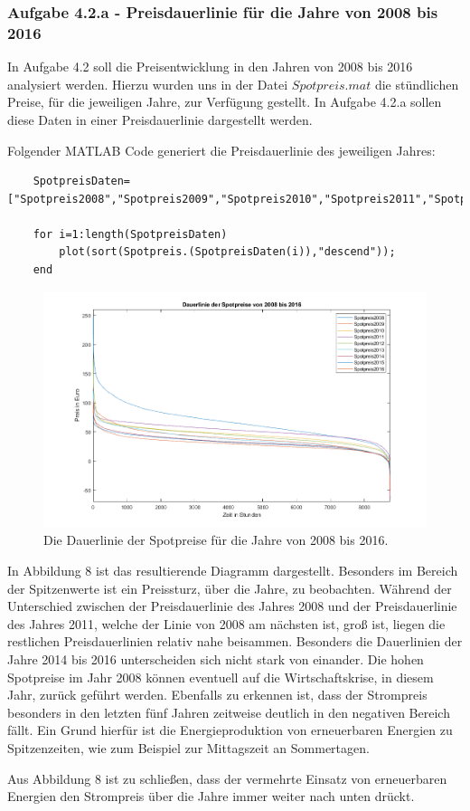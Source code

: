 \documentclass[a4paper,12pt]{article}
\begin{document}
	\subsubsection{Aufgabe 4.2.a - Preisdauerlinie für die Jahre von 2008 bis 2016}
	In Aufgabe 4.2 soll die Preisentwicklung in den Jahren von 2008 bis 2016 analysiert werden. Hierzu wurden uns in der Datei $Spotpreis.mat$ die stündlichen Preise, für die jeweiligen Jahre, zur Verfügung gestellt.\newline
	In Aufgabe 4.2.a sollen diese Daten in einer Preisdauerlinie dargestellt werden.\\ \par
	Folgender MATLAB Code generiert die Preisdauerlinie des jeweiligen Jahres:
	\begin{lstlisting}
	SpotpreisDaten=["Spotpreis2008","Spotpreis2009","Spotpreis2010","Spotpreis2011","Spotpreis2012","Spotpreis2013","Spotpreis2014","Spotpreis2015","Spotpreis2016"];
	
	for i=1:length(SpotpreisDaten)
		plot(sort(Spotpreis.(SpotpreisDaten(i)),"descend"));
	end
	\end{lstlisting}
	\begin{figure}[H]
		\centering
		\includegraphics[width=12cm]{img/results/DauerlinieSpotpreise}
		\caption{Die Dauerlinie der Spotpreise für die Jahre von 2008 bis 2016.}
	\end{figure}
	\noindent In Abbildung 8 ist das resultierende Diagramm dargestellt. Besonders im Bereich der Spitzenwerte ist ein Preissturz, über die Jahre, zu beobachten. Während der Unterschied zwischen der Preisdauerlinie des Jahres 2008 und der Preisdauerlinie des Jahres 2011, welche der Linie von 2008 am nächsten ist, groß ist, liegen die restlichen Preisdauerlinien relativ nahe beisammen. Besonders die Dauerlinien der Jahre 2014 bis 2016 unterscheiden sich nicht stark von einander. Die hohen Spotpreise im Jahr 2008 können eventuell auf die Wirtschaftskrise, in diesem Jahr, zurück geführt werden.\newline
	Ebenfalls zu erkennen ist, dass der Strompreis besonders in den letzten fünf Jahren zeitweise deutlich in den negativen Bereich fällt. Ein Grund hierfür ist die Energieproduktion von erneuerbaren Energien zu Spitzenzeiten, wie zum Beispiel zur Mittagszeit an Sommertagen.\\ \par
	\noindent Aus Abbildung 8 ist zu schließen, dass der vermehrte Einsatz von erneuerbaren Energien den Strompreis über die Jahre immer weiter nach unten drückt.
\end{document}
